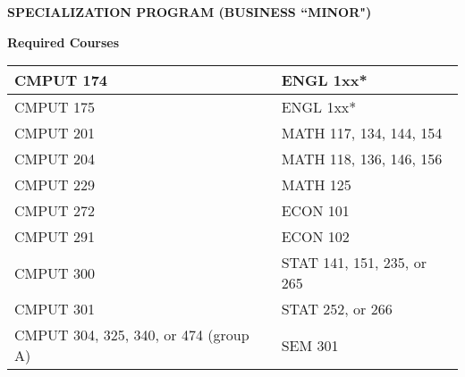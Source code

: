 \documentclass[12pt]{article}
\begin{document}
\begin{center}
    \textbf{SPECIALIZATION PROGRAM (BUSINESS ``MINOR")}
\end{center}
\textbf{Required Courses}
\begin{center}
\begin{tabular}{| l | l | }
  \hline
 CMPUT 174\qquad\qquad\qquad\qquad \hfill\raisebox{-3px}{\CheckBox[\symbolchoice{check},height=.25in,width=.25in, name=c]{}} & ENGL 1xx* \qquad\qquad\qquad\qquad\qquad\hfill\raisebox{-3px}{\CheckBox[height=.25in,width=.25in, name=d]{}}\\ 
  \hline
 CMPUT 175 \hfill\raisebox{-3px}{\CheckBox[height=0.25in,width=0.25in, name=a]{}}& ENGL 1xx* \hfill\raisebox{-3px}{\CheckBox[width=0.25in,height=0.25in, name=b]{}}\\
  \hline
 CMPUT 201 \hfill\raisebox{-3px}{\CheckBox[height=0.25in,width=0.25in, name=1]{}}& MATH 117, 134, 144, 154 \hfill\raisebox{-3px}{\CheckBox[height=0.25in,width=0.25in, name=2]{}}\\
  \hline
 CMPUT 204 \hfill\raisebox{-3px}{\CheckBox[height=0.25in,width=0.25in, name=3]{}}& MATH 118, 136, 146, 156\hfill\raisebox{-3px}{\CheckBox[height=0.25in,width=0.25in, name=4]{}}\\
  \hline
 CMPUT 229 \hfill\raisebox{-3px}{\CheckBox[height=0.25in,width=0.25in, name=5]{}}& MATH 125\hfill\raisebox{-3px}{\CheckBox[height=0.25in,width=0.25in, name=6]{}}\\
  \hline
 CMPUT 272 \hfill\raisebox{-3px}{\CheckBox[height=0.25in,width=0.25in, name=fd]{}}& ECON 101\hfill\raisebox{-3px}{\CheckBox[height=0.25in,width=0.25in, name=ask]{}}\\
  \hline
 CMPUT 291 \hfill\raisebox{-3px}{\CheckBox[height=0.25in,width=0.25in, name=7]{}}& ECON 102\hfill\raisebox{-3px}{\CheckBox[height=0.25in,width=0.25in, name=8]{}}\\
  \hline
 CMPUT 300 \hfill\raisebox{-3px}{\CheckBox[height=0.25in,width=0.25in, name=9]{}}& STAT 141, 151, 235, or 265\hfill\raisebox{-3px}{\CheckBox[height=0.25in,width=0.25in, name=0]{}}\\
  \hline
 CMPUT 301 \hfill\raisebox{-3px}{\CheckBox[height=0.25in,width=0.25in, name=e]{}}& STAT 252, or 266\hfill\raisebox{-3px}{\CheckBox[height=0.25in,width=0.25in, name=f]{}}\\
  \hline
 CMPUT 304, 325, 340, or 474 (group A) \hfill\raisebox{-3px}{\CheckBox[height=0.25in,width=0.25in, name=g]{}}& SEM 301\hfill\raisebox{-3px}{\CheckBox[height=0.25in,width=0.25in, name=h]{}}\\

\end{tabular}
\end{center}
\end{document}
